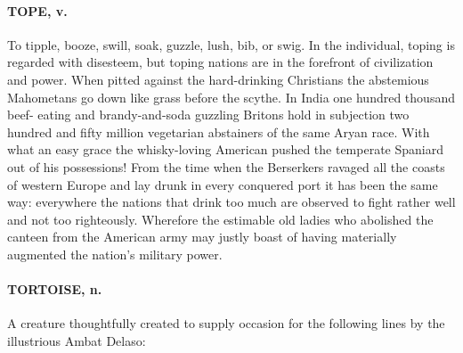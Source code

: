 \documentclass[11pt]{article}
\begin{document}
\paragraph{TOPE, v.}  To tipple, booze, swill, soak, guzzle, lush, bib, or swig.
In the individual, toping is regarded with disesteem, but toping
nations are in the forefront of civilization and power.  When pitted
against the hard-drinking Christians the abstemious Mahometans go down
like grass before the scythe.  In India one hundred thousand beef-
eating and brandy-and-soda guzzling Britons hold in subjection two
hundred and fifty million vegetarian abstainers of the same Aryan
race.  With what an easy grace the whisky-loving American pushed the
temperate Spaniard out of his possessions!  From the time when the
Berserkers ravaged all the coasts of western Europe and lay drunk in
every conquered port it has been the same way:  everywhere the nations
that drink too much are observed to fight rather well and not too
righteously.  Wherefore the estimable old ladies who abolished the
canteen from the American army may justly boast of having materially
augmented the nation's military power.

\paragraph{TORTOISE, n.}  A creature thoughtfully created to supply occasion for
the following lines by the illustrious Ambat Delaso:
\end{document}
